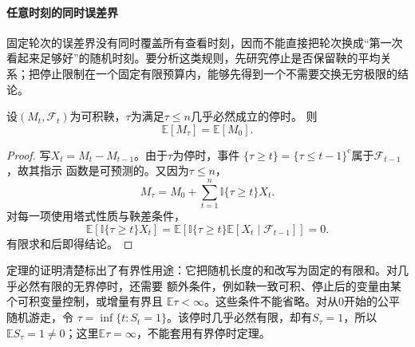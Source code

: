 \paragraph{任意时刻的同时误差界}
\label{sec:rv-anytime}
\label{sec:stoch-self-normalized-adaptive-design}
固定轮次的误差界没有同时覆盖所有查看时刻，因而不能直接把轮次换成“第一次看起来足够好”的随机时刻。要分析这类规则，先研究停止是否保留鞅的平均关系；把停止限制在一个固定有限预算内，能够先得到一个不需要交换无穷极限的结论。
\begin{theorem}[有界停时的可选停止]
  \label{thm:stoch-bounded-optional-stopping}
  设$(M_t,\mathcal{F}_t)$为可积鞅，$\tau$为满足$\tau\leq n$几乎必然成立的停时。
  则
  \[
    \mathbb{E}[M_\tau]=\mathbb{E}[M_0].
  \]
\end{theorem}

\begin{proof}
写$X_t=M_t-M_{t-1}$。由于$\tau$为停时，事件
$\{\tau\geq t\}=\{\tau\leq t-1\}^{\mathrm{c}}$属于$\mathcal{F}_{t-1}$，故其指示
函数是可预测的。又因为$\tau\leq n$，
\[
  M_\tau
  =
  M_0+\sum_{t=1}^{n}\mathbb{I}\{\tau\geq t\}X_t.
\]
对每一项使用塔式性质与鞅差条件，
\[
  \mathbb{E}\!\left[
    \mathbb{I}\{\tau\geq t\}X_t
  \right]
  =
  \mathbb{E}\!\left[
    \mathbb{I}\{\tau\geq t\}
    \mathbb{E}[X_t\mid\mathcal{F}_{t-1}]
  \right]
  =0.
\]
有限求和后即得结论。
\end{proof}

定理的证明清楚标出了有界性用途：它把随机长度的和改写为固定的有限和。对几乎必然有限的无界停时，还需要
额外条件，例如鞅一致可积、停止后的变量由某个可积变量控制，或增量有界且
$\mathbb{E}\tau<\infty$。这些条件不能省略。对从$0$开始的公平随机游走，令
$\tau=\inf\{t:S_t=1\}$。该停时几乎必然有限，却有$S_\tau=1$，所以
$\mathbb{E}S_\tau=1\neq0$；这里$\mathbb{E}\tau=\infty$，不能套用有界停时定理。

